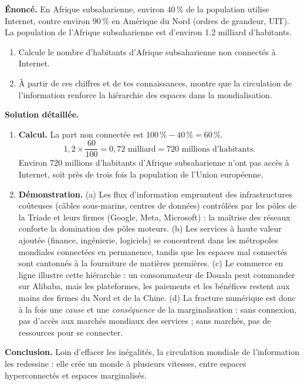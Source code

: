 \documentclass[11pt]{article}
\newcounter{popsec}
\newcounter{popsub}
\newcommand{\courssub}[1]{%
  \stepcounter{popsub}%
  \par\vspace{9pt}\noindent{\popxbold\fontsize{11.5}{13}\selectfont\color{popink}{\color{poporange}\thepopsec.\thepopsub}\hspace{6pt}#1}\par\nopagebreak\vspace{4pt}
}
\begin{document}
\begin{exoresolu}
\textbf{Énoncé.} En Afrique subsaharienne, environ $40\,\%$ de la population utilise Internet, contre environ $90\,\%$ en Amérique du Nord (ordres de grandeur, UIT). La population de l'Afrique subsaharienne est d'environ \num{1,2} milliard d'habitants.
\begin{enumerate}
\item Calcule le nombre d'habitants d'Afrique subsaharienne non connectés à Internet.
\item À partir de ces chiffres et de tes connaissances, montre que la circulation de l'information renforce la hiérarchie des espaces dans la mondialisation.
\end{enumerate}
\tcblower
\textbf{Solution détaillée.}
\begin{enumerate}
\item \textbf{Calcul.} La part non connectée est $100\,\% - 40\,\% = 60\,\%$.
\[ 1,2 \times \frac{60}{100} = 0,72 \text{ milliard} = 720 \text{ millions d'habitants}. \]
Environ 720 millions d'habitants d'Afrique subsaharienne n'ont pas accès à Internet, soit près de trois fois la population de l'Union européenne.
\item \textbf{Démonstration.} (a) Les flux d'information empruntent des infrastructures coûteuses (câbles sous-marins, centres de données) contrôlées par les pôles de la Triade et leurs firmes (Google, Meta, Microsoft) : la maîtrise des réseaux conforte la domination des pôles moteurs. (b) Les services à haute valeur ajoutée (finance, ingénierie, logiciels) se concentrent dans les métropoles mondiales connectées en permanence, tandis que les espaces mal connectés sont cantonnés à la fourniture de matières premières. (c) Le commerce en ligne illustre cette hiérarchie : un consommateur de Douala peut commander sur Alibaba, mais les plateformes, les paiements et les bénéfices restent aux mains des firmes du Nord et de la Chine. (d) La fracture numérique est donc à la fois une \emph{cause} et une \emph{conséquence} de la marginalisation : sans connexion, pas d'accès aux marchés mondiaux des services ; sans marchés, pas de ressources pour se connecter.
\end{enumerate}
\textbf{Conclusion.} Loin d'effacer les inégalités, la circulation mondiale de l'information les redessine : elle crée un monde à plusieurs vitesses, entre espaces hyperconnectés et espaces marginalisés.
\end{exoresolu}

\courssub{Les mouvements financiers et les IDE}
\end{document}
